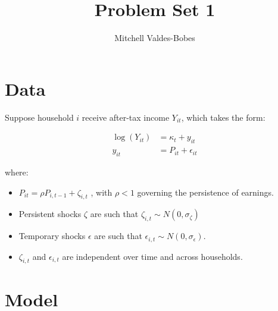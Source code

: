 \documentclass[12pt]{article}
\begin{document}
\title{Problem Set 1 }
\author{Mitchell Valdes-Bobes}
\maketitle



\section{Data}
Suppose household $i$ receive after-tax income $Y_{i t}$, which takes the form:

\begin{align*}
    \log \left(Y_{i t}\right) &=\kappa_{t}+y_{i t} \\
    y_{i t} &=P_{i t}+\epsilon_{i t}
\end{align*}

where:
\begin{itemize}
    \item $P_{i t}=\rho P_{i, t-1}+\zeta_{i, t}$ , with $\rho<1$ governing the persistence of earnings. 
    \item Persistent shocks $\zeta$ are such that $\zeta_{i, t} \sim N\left(0, \sigma_{\zeta}\right)$
    \item Temporary shocks $\epsilon$ are such that  $\epsilon_{i, t} \sim N\left(0, \sigma_{\epsilon}\right)$. 
    \item $\zeta_{i, t}$ and $\epsilon_{i, t}$ are independent over time and across households.
\end{itemize}

\section{Model}



\end{document}
